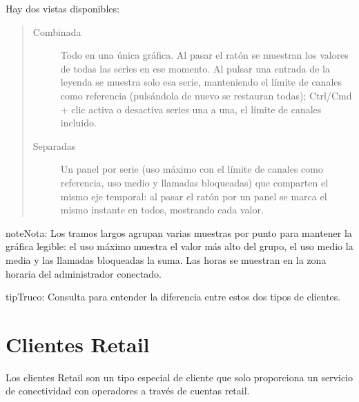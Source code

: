 \documentclass[letterpaper,10pt,spanish]{sphinxmanual}
\begin{document}
Hay dos vistas disponibles:
\begin{quote}
\begin{description}
\item[{Combinada}] \leavevmode
Todo en una única gráfica. Al pasar el ratón se muestran los valores de todas las series en ese momento. Al pulsar una entrada de la leyenda se muestra solo esa serie, manteniendo el límite de canales como referencia (pulsándola de nuevo se restauran todas); Ctrl/Cmd + clic activa o desactiva series una a una, el límite de canales incluido.

\item[{Separadas}] \leavevmode
Un panel por serie (uso máximo con el límite de canales como referencia, uso medio y llamadas bloqueadas) que comparten el mismo eje temporal: al pasar el ratón por un panel se marca el mismo instante en todos, mostrando cada valor.

\end{description}
\end{quote}

\begin{notice}{note}{Nota:}
Los tramos largos agrupan varias muestras por punto para mantener la gráfica legible: el uso máximo muestra el valor más alto del grupo, el uso medio la media y las llamadas bloqueadas la suma. Las horas se muestran en la zona horaria del administrador conectado.
\end{notice}

\begin{notice}{tip}{Truco:}
Consulta {\hyperref[administration_portal/brand/clients/retail:differences\string-between\string-retail\string-and\string-residential\string-clients]{}} para entender la diferencia entre estos dos tipos de clientes.
\end{notice}
\label{administration_portal/client/retail/index:retail-clients}

\section{Clientes Retail}
\label{administration_portal/client/retail/index:retail-clients}\label{administration_portal/client/retail/index:clientes-retail}\label{administration_portal/client/retail/index::doc}\label{administration_portal/client/retail/index:id1}
Los clientes Retail son un tipo especial de cliente que solo proporciona un servicio de conectividad con operadores a través de cuentas retail.
\end{document}
